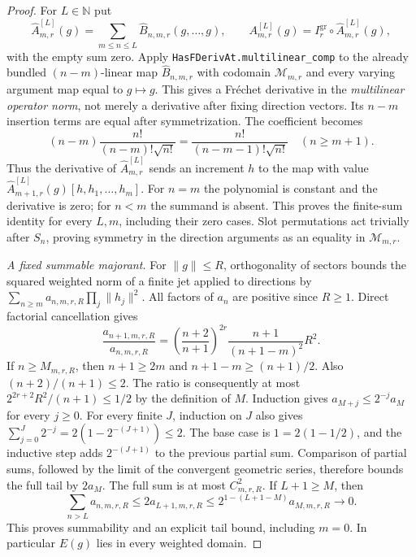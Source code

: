 \documentclass[11pt,a4paper]{article}
\theoremstyle{definition}
\theoremstyle{remark}
\begin{document}
\begin{proof}
For $L\in\mathbb N$ put
\[
 \widehat A^{[L]}_{m,r}(g)
   =\sum_{m\leq n\leq L}\widehat B_{n,m,r}(g,\ldots,g),
 \qquad A^{[L]}_{m,r}(g)=I_r^{\mathrm{gr}}\circ\widehat A^{[L]}_{m,r}(g),
\]
with the empty sum zero. Apply
\nolinkurl{HasFDerivAt.multilinear_comp} to the already bundled
$(n-m)$-linear map $\widehat B_{n,m,r}$ with codomain
$\mathcal M_{m,r}$ and every varying argument map equal to
$g\mapsto g$. This gives a Fr\'echet derivative in the
\emph{multilinear operator norm}, not merely a derivative after
fixing direction vectors. Its $n-m$ insertion terms are equal
after symmetrization. The coefficient becomes
\[
 (n-m)\frac{n!}{(n-m)!\sqrt{n!}}
       =\frac{n!}{(n-m-1)!\sqrt{n!}}\quad(n\geq m+1).
\]
Thus the derivative of $\widehat A^{[L]}_{m,r}$ sends an
increment $h$ to the map with value
$\widehat A^{[L]}_{m+1,r}(g)[h,h_1,\ldots,h_m]$.
For $n=m$ the polynomial is constant and the derivative is zero;
for $n<m$ the summand is absent. This proves the finite-sum
identity for every $L,m$, including their zero cases.
Slot permutations act trivially after $S_n$, proving symmetry
in the direction arguments as an equality in $\mathcal M_{m,r}$.

\emph{A fixed summable majorant.}
For $\|g\|\leq R$, orthogonality of sectors bounds the squared
weighted norm of a finite jet applied to directions by
$\sum_{n\geq m}a_{n,m,r,R}\prod_j\|h_j\|^2$.
All factors of $a_n$ are positive since $R\geq1$. Direct
factorial cancellation gives
\[
 \frac{a_{n+1,m,r,R}}{a_{n,m,r,R}}
  =\left(\frac{n+2}{n+1}\right)^{2r}
              \frac{n+1}{(n+1-m)^2}R^2.
\]
If $n\geq M_{m,r,R}$, then $n+1\geq2m$ and
$n+1-m\geq(n+1)/2$. Also $(n+2)/(n+1)\leq2$.
The ratio is consequently at most
$2^{2r+2}R^2/(n+1)\leq1/2$ by the definition of $M$.
Induction gives $a_{M+j}\leq2^{-j}a_M$ for every $j\geq0$.
For every finite $J$, induction on $J$ also gives
$\sum_{j=0}^J2^{-j}=2(1-2^{-(J+1)})\leq2$.
The base case is $1=2(1-1/2)$, and the inductive step adds
$2^{-(J+1)}$ to the previous partial sum. Comparison of partial
sums, followed by the limit of the convergent geometric series,
therefore bounds the full tail by $2a_M$. The full sum is at
most $C_{m,r,R}^2$. If $L+1\geq M$, then
\[
 \sum_{n>L}a_{n,m,r,R}\leq2a_{L+1,m,r,R}
                  \leq2^{1-(L+1-M)}a_{M,m,r,R}\longrightarrow0. \tag{CJ5}
\]
This proves summability and an explicit tail bound, including
$m=0$. In particular $E(g)$ lies in every weighted domain.


\end{proof}
\end{document}
